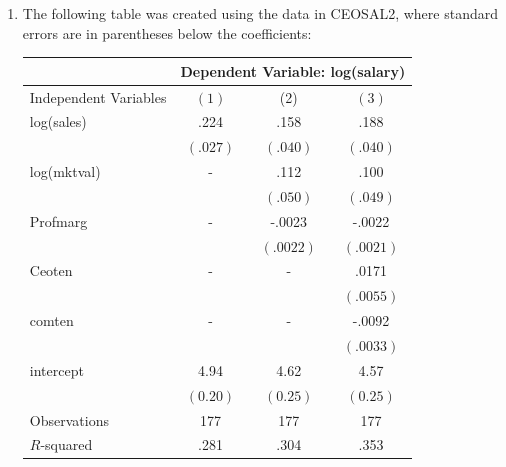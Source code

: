 \documentclass[12pt]{article}
\begin{document}
\begin{enumerate}
{\begin{enumerate}
Again, since these $t$-statistics are below the critical value of 1.98, neither variable is individually significant.

\item Since some firms have zero debt and negative earnings, it would be inappropriate to use $\log(\text{dkr})$ or $\log(\text{eps})$ in the model. The logarithm is undefined for non-positive values, which would cause issues in the regression analysis.

\item The overall evidence for predictability of stock returns is weak. The $R^2$ values in both models are very low (0.0395 and 0.0330), indicating that the explanatory variables do not explain much of the variation in returns. Additionally, the explanatory variables are not statistically significant, either individually or jointly. This suggests that the firm characteristics included in this analysis do not provide a strong basis for predicting stock returns.

\end{enumerate}

}



\item The following table was created using the data in CEOSAL2, where standard errors are in parentheses below the coefficients:
\begin{center}
\begin{tabular}{|lccc|}
\hline & \multicolumn{3}{l|}{ Dependent Variable: log(salary) } \\
\hline Independent Variables & $(1)$ & (2) & $(3)$ \\
\hline log(sales) & .224 & .158 & .188 \\
& $(.027)$ & $(.040)$ & $(.040)$ \\
log(mktval) & - & .112 & .100 \\
& & $(.050)$ & $(.049)$ \\
Profmarg & - & -.0023 & -.0022 \\
& & $(.0022)$ & $(.0021)$ \\
Ceoten & - & - & .0171 \\
& & & $(.0055)$ \\
comten & - & - & -.0092 \\
& & & $(.0033)$ \\
intercept & 4.94 & 4.62 & 4.57 \\
& $(0.20)$ & $(0.25)$ & $(0.25)$ \\
Observations & 177 & 177 & 177 \\
$R$-squared & .281 & .304 & .353 \\
\hline
\end{tabular}
\end{center}


\end{enumerate}
\end{document}
